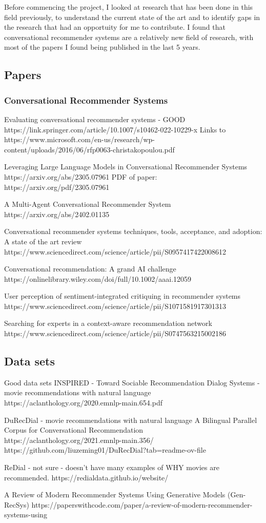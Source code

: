 

Before commencing the project, I looked at research that has been done in this field previously, 
to understand the current state of the art and to identify gaps in the research that had an opportuity for me to contribute.
I found that conversational recommender systems are a relatively new field of research, with most of the papers I found being published in the last 5 years.


\subsection{Papers}
\subsubsection{Conversational Recommender Systems}


Evaluating conversational recommender systems - GOOD
https://link.springer.com/article/10.1007/s10462-022-10229-x
Links to
https://www.microsoft.com/en-us/research/wp-content/uploads/2016/06/rfp0063-christakopoulou.pdf


Leveraging Large Language Models in Conversational Recommender Systems
https://arxiv.org/abs/2305.07961
PDF of paper: https://arxiv.org/pdf/2305.07961

A Multi-Agent Conversational Recommender System
https://arxiv.org/abs/2402.01135

Conversational recommender systems techniques, tools, acceptance, and adoption: A state of the art review
https://www.sciencedirect.com/science/article/pii/S0957417422008612



Conversational recommendation: A grand AI challenge
https://onlinelibrary.wiley.com/doi/full/10.1002/aaai.12059

User perception of sentiment-integrated critiquing in recommender systems
https://www.sciencedirect.com/science/article/pii/S1071581917301313

Searching for experts in a context-aware recommendation network
https://www.sciencedirect.com/science/article/pii/S0747563215002186

\subsection{Data sets}
Good data sets
INSPIRED - Toward Sociable Recommendation Dialog Systems - movie recommendations with natural language
https://aclanthology.org/2020.emnlp-main.654.pdf

DuRecDial - movie recommendations with natural language
A Bilingual Parallel Corpus for Conversational Recommendation
https://aclanthology.org/2021.emnlp-main.356/
https://github.com/liuzeming01/DuRecDial?tab=readme-ov-file

ReDial - not sure - doesn't have many examples of WHY movies are recommended.
https://redialdata.github.io/website/

 A Review of Modern Recommender Systems Using Generative Models (Gen-RecSys) 
https://paperswithcode.com/paper/a-review-of-modern-recommender-systems-using
